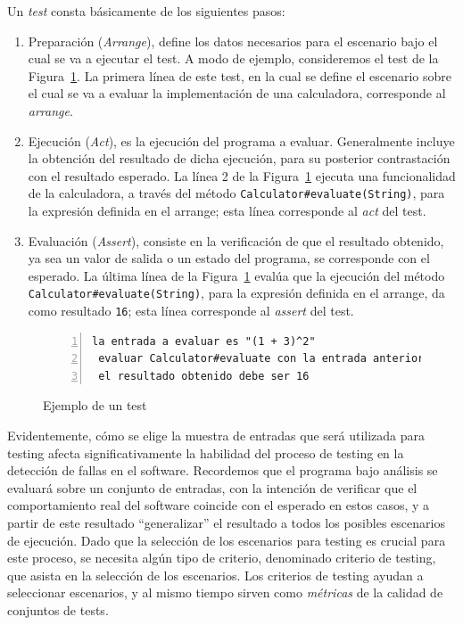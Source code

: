 Un \emph{test} consta b\'asicamente de los siguientes pasos: 
\begin{enumerate}
	\item Preparaci\'on (\emph{Arrange}), define los datos necesarios para el escenario bajo el cual se va a ejecutar el test. A modo de ejemplo, consideremos el test de la Figura~\ref{figures.examples.test.manual}. La primera l\'inea de este test, en la cual se define el escenario sobre el cual se va a evaluar la implementaci\'on de una calculadora, corresponde al \emph{arrange}.
	
	\item Ejecuci\'on (\emph{Act}), es la ejecuci\'on del programa a evaluar. Generalmente incluye la obtenci\'on del resultado de dicha ejecuci\'on, para su posterior contrastaci\'on con el resultado esperado. La l\'inea 2 de la Figura~\ref{figures.examples.test.manual} ejecuta una funcionalidad de la calculadora, a trav\'es del m\'etodo \texttt{Calculator\#evaluate(String)}, para la expresi\'on definida en el arrange; esta l\'inea corresponde al \emph{act} del test. 
	
	\item Evaluaci\'on (\emph{Assert}), consiste en la verificaci\'on de que el resultado obtenido, ya sea un valor de salida o un estado del programa, se corresponde con el esperado. La \'ultima l\'inea de la Figura~\ref{figures.examples.test.manual} eval\'ua que la ejecuci\'on del m\'etodo \texttt{Calculator\#evaluate(String)}, para la expresi\'on definida en el arrange, da como resultado \texttt{16}; esta l\'inea corresponde al \emph{assert} del test.
\end{enumerate}

\begin{figure}
	\begin{lstlisting}[frame=single, mathescape=true,numbers=left,framexleftmargin=1.5em,basicstyle={},xleftmargin=.055\textwidth,xrightmargin=.01\textwidth]
 la entrada a evaluar es "(1 + 3)^2"
 evaluar Calculator#evaluate con la entrada anterior
 el resultado obtenido debe ser 16
	\end{lstlisting}
	\caption{Ejemplo de un test}
	\label{figures.examples.test.manual}
\end{figure}

Evidentemente, c\'omo se elige la muestra de entradas que ser\'a utilizada para testing afecta significativamente la habilidad del proceso de testing en la detecci\'on de fallas en el software. Recordemos que el programa bajo an\'alisis se evaluar\'a sobre un conjunto de entradas, con la intenci\'on de verificar que el comportamiento real del software coincide con el esperado en estos casos, y a partir de este resultado ``generalizar'' el resultado a todos los posibles escenarios de ejecuci\'on. Dado que la selecci\'on de los escenarios para testing es crucial para este proceso, se necesita alg\'un tipo de criterio, denominado criterio de testing, que asista en la selecci\'on de los escenarios. Los criterios de testing ayudan a seleccionar escenarios, y al mismo tiempo sirven como \emph{m\'etricas} de la calidad de conjuntos de tests. 

